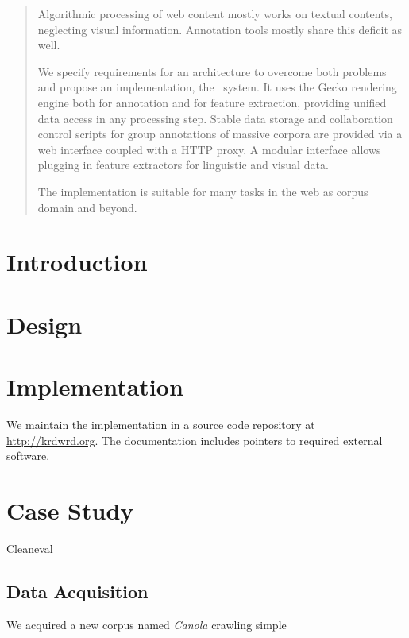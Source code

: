 
\begin{abstract}
Algorithmic processing of web content mostly works on textual contents, neglecting visual information.
Annotation tools mostly share this deficit as well.

We specify requirements for an architecture to overcome both problems and propose an implementation, the \KrdWrd~system.
It uses the Gecko rendering engine both for annotation and for feature extraction, providing unified data access in any processing step.
Stable data storage and collaboration control scripts for group annotations of massive corpora are provided via a web interface coupled with a HTTP proxy.
A modular interface allows plugging in feature extractors for linguistic and visual data.

The implementation is suitable for many tasks in the web as corpus domain and beyond.
\end{abstract}

\section{Introduction}


\section{Design\label{design}}


\section{Implementation\label{impl}}

We maintain the implementation in a source code repository at \url{http://krdwrd.org}.
The documentation includes pointers to required external software.



\section{Case Study\label{casestudy}}

Cleaneval

\subsection{Data Acquisition\label{datagather}}

We acquired a new corpus named \textit{Canola} 
crawling simple


